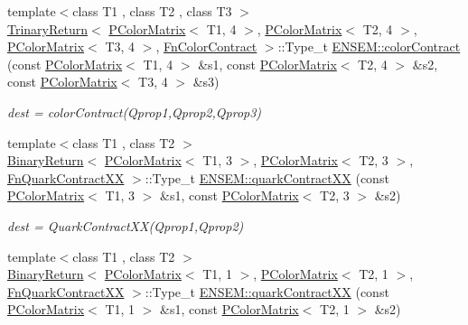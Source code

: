 \begin{DoxyCompactItemize}
{\footnotesize template$<$class T1 , class T2 , class T3 $>$ }\\\mbox{\hyperlink{structENSEM_1_1TrinaryReturn}{Trinary\+Return}}$<$ \mbox{\hyperlink{classENSEM_1_1PColorMatrix}{P\+Color\+Matrix}}$<$ T1, 4 $>$, \mbox{\hyperlink{classENSEM_1_1PColorMatrix}{P\+Color\+Matrix}}$<$ T2, 4 $>$, \mbox{\hyperlink{classENSEM_1_1PColorMatrix}{P\+Color\+Matrix}}$<$ T3, 4 $>$, \mbox{\hyperlink{structENSEM_1_1FnColorContract}{Fn\+Color\+Contract}} $>$\+::Type\+\_\+t \mbox{\hyperlink{group__primcolormatrix_ga2cd5ca8c1ac1d4fbf5c4d27665ccb996}{E\+N\+S\+E\+M\+::color\+Contract}} (const \mbox{\hyperlink{classENSEM_1_1PColorMatrix}{P\+Color\+Matrix}}$<$ T1, 4 $>$ \&s1, const \mbox{\hyperlink{classENSEM_1_1PColorMatrix}{P\+Color\+Matrix}}$<$ T2, 4 $>$ \&s2, const \mbox{\hyperlink{classENSEM_1_1PColorMatrix}{P\+Color\+Matrix}}$<$ T3, 4 $>$ \&s3)
\begin{DoxyCompactList}\small\item\em dest = color\+Contract(\+Qprop1,\+Qprop2,\+Qprop3) \end{DoxyCompactList}\item 
{\footnotesize template$<$class T1 , class T2 $>$ }\\\mbox{\hyperlink{structENSEM_1_1BinaryReturn}{Binary\+Return}}$<$ \mbox{\hyperlink{classENSEM_1_1PColorMatrix}{P\+Color\+Matrix}}$<$ T1, 3 $>$, \mbox{\hyperlink{classENSEM_1_1PColorMatrix}{P\+Color\+Matrix}}$<$ T2, 3 $>$, \mbox{\hyperlink{structENSEM_1_1FnQuarkContractXX}{Fn\+Quark\+Contract\+XX}} $>$\+::Type\+\_\+t \mbox{\hyperlink{group__primcolormatrix_ga2253a81d9cf66ad41a9c2426ef5a8b84}{E\+N\+S\+E\+M\+::quark\+Contract\+XX}} (const \mbox{\hyperlink{classENSEM_1_1PColorMatrix}{P\+Color\+Matrix}}$<$ T1, 3 $>$ \&s1, const \mbox{\hyperlink{classENSEM_1_1PColorMatrix}{P\+Color\+Matrix}}$<$ T2, 3 $>$ \&s2)
\begin{DoxyCompactList}\small\item\em dest = Quark\+Contract\+X\+X(\+Qprop1,\+Qprop2) \end{DoxyCompactList}\item 
{\footnotesize template$<$class T1 , class T2 $>$ }\\\mbox{\hyperlink{structENSEM_1_1BinaryReturn}{Binary\+Return}}$<$ \mbox{\hyperlink{classENSEM_1_1PColorMatrix}{P\+Color\+Matrix}}$<$ T1, 1 $>$, \mbox{\hyperlink{classENSEM_1_1PColorMatrix}{P\+Color\+Matrix}}$<$ T2, 1 $>$, \mbox{\hyperlink{structENSEM_1_1FnQuarkContractXX}{Fn\+Quark\+Contract\+XX}} $>$\+::Type\+\_\+t \mbox{\hyperlink{group__primcolormatrix_gadb40ddb5edfab27bf7bb4b8cd7430ad6}{E\+N\+S\+E\+M\+::quark\+Contract\+XX}} (const \mbox{\hyperlink{classENSEM_1_1PColorMatrix}{P\+Color\+Matrix}}$<$ T1, 1 $>$ \&s1, const \mbox{\hyperlink{classENSEM_1_1PColorMatrix}{P\+Color\+Matrix}}$<$ T2, 1 $>$ \&s2)

\end{DoxyCompactItemize}
